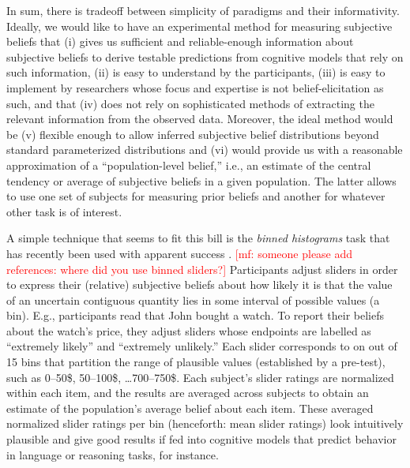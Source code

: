\documentclass[10pt,letterpaper]{article}
\newcommand{\mf}[1]{\textcolor{Red}{[mf: #1]}}
\newcommand{\citep}[1]{\cite{#1}}
\begin{document}
In sum, there is tradeoff between simplicity of paradigms and their informativity. Ideally, we
would like to have an experimental method for measuring subjective beliefs that (i) gives us
sufficient and reliable-enough information about subjective beliefs to derive testable
predictions from cognitive models that rely on such information, (ii) is easy to understand by
the participants, (iii) is easy to implement by researchers whose focus and expertise is not
belief-elicitation as such, and that (iv) does not rely on sophisticated methods of extracting
the relevant information from the observed data. Moreover, the ideal method would be (v)
flexible enough to allow inferred subjective belief distributions beyond standard parameterized
distributions and (vi) would provide us with a reasonable approximation of a ``population-level
belief,'' i.e., an estimate of the central tendency or average of subjective beliefs in a given
population. The latter allows to use one set of subjects for measuring prior beliefs and
another for whatever other task is of interest.

A simple technique that seems to fit this bill is the \emph{binned histograms} task that has
recently been used with apparent success
\citep{KaoWu2014:Nonliteral-Unde,SchollerFranke2015:Semantic-values}. \mf{someone please add
  references: where did you use binned sliders?} Participants adjust sliders in order to
express their (relative) subjective beliefs about how likely it is that the value of an
uncertain contiguous quantity lies in some interval of possible values (a bin). E.g.,
participants read that John bought a watch.  To report their beliefs about the watch's price,
they adjust sliders whose endpoints are labelled as ``extremely likely'' and ``extremely
unlikely.'' Each slider corresponds to on out of 15 bins that partition the range of plausible
values (established by a pre-test), such as 0--50\$, 50--100\$, \dots 700--750\$. Each
subject's slider ratings are normalized within each item, and the results are averaged across
subjects to obtain an estimate of the population's average belief about each item. These
averaged normalized slider ratings per bin (henceforth: mean slider ratings) look intuitively
plausible and give good results if fed into cognitive models that predict behavior in language
or reasoning tasks, for instance.
\end{document}
